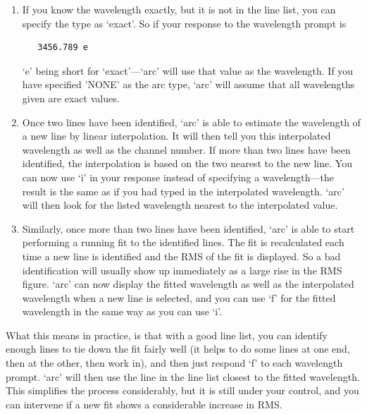 \documentclass[11pt,twoside]{article}
\newcommand{\latorhtm}[2]{#1}
\newcommand{\latorhtm}[2]{#2}
\begin{document}
\begin{enumerate}
\item
   If you know the wavelength exactly, but it is not in the line list,
   you can specify the type as `exact'.  So if your response to the
   wavelength prompt is

\begin{verbatim}
   3456.789 e
\end{verbatim}

   `e' being short for `exact'\latorhtm{---}{-}`arc' will use that value
   as the
   wavelength. If you have specified 'NONE' as the arc type, `arc' will
   assume that all wavelengths given are exact values.

\item
   Once two lines have been identified, `arc' is able to estimate the
   wavelength of a new line by linear interpolation.  It will then tell
   you this interpolated wavelength as well as the channel number.  If
   more than two lines have been identified, the interpolation is based
   on the two nearest to the new line.  You can now use `i' in your
   response instead of specifying a wavelength\latorhtm{---}{-}the result is
   the same
   as if you had typed in the interpolated wavelength.  `arc' will then
   look for the listed wavelength nearest to the interpolated value.

\item
   Similarly, once more than two lines have been identified, `arc' is
   able to start performing a running fit to the identified lines.  The
   fit is recalculated each time a new line is identified and the RMS of
   the fit is displayed.  So a bad identification will usually show up
   immediately as a large rise in the RMS figure.  `arc' can now display
   the fitted wavelength as well as the interpolated wavelength when a
   new line is selected, and you can use `f' for the fitted wavelength
   in the same way as you can use `i'.
\end{enumerate}

   What this means in practice, is that with a good line list, you can
   identify enough lines to tie down the fit fairly well (it helps to do
   some lines at one end, then at the other, then work in), and then
   just respond `f' to each wavelength prompt.  `arc' will then use the
   line in the line list closest to the fitted wavelength.  This
   simplifies the process considerably, but it is still under your
   control, and you can intervene if a new fit shows a considerable
   increase in RMS.
\end{document}
